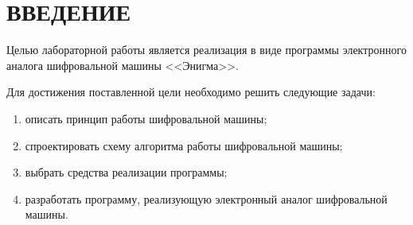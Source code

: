 \chapter*{ВВЕДЕНИЕ}

Целью лабораторной работы является реализация в виде программы электронного аналога шифровальной машины <<Энигма>>.

Для достижения поставленной цели необходимо решить следующие задачи:
\begin{enumerate}
	\item описать принцип работы шифровальной машины;
	\item спроектировать схему алгоритма работы шифровальной машины;
	\item выбрать средства реализации программы;
	\item разработать программу, реализующую электронный аналог шифровальной машины.
\end{enumerate}
